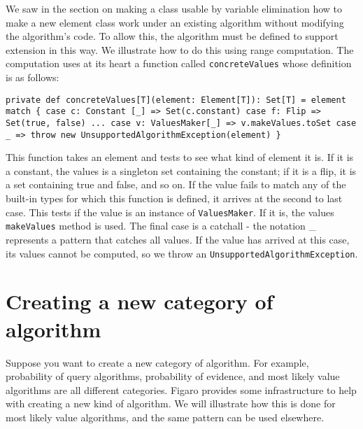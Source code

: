 We saw in the section on making a class usable by variable elimination how to make a new element class work under an existing algorithm without modifying the algorithm's code. To allow this, the algorithm must be defined to support extension in this way. We illustrate how to do this using range computation. The computation uses at its heart a function called \texttt{concreteValues} whose definition is as follows:


\begin{flushleft}
\texttt{private def concreteValues[T](element: Element[T]): Set[T] =
element match \{
\newline \tab case c: Constant [\_] => Set(c.constant)
\newline \tab case f: Flip => Set(true, false)
\newline \tab ...
\newline \tab case v: ValuesMaker[\_] => v.makeValues.toSet
\newline \tab case \_ => throw new UnsupportedAlgorithmException(element)
\newline \}
}
\end{flushleft}

This function takes an element and tests to see what kind of element it is. If it is a constant, the values is a singleton set containing the constant; if it is a flip, it is a set containing true and false, and so on. If the value fails to match any of the built-in types for which this function is defined, it arrives at the second to last case. This tests if the value is an instance of \texttt{ValuesMaker}. If it is, the values \texttt{makeValues} method is used. The final case is a catchall - the notation \_ represents a pattern that catches all values. If the value has arrived at this case, its values cannot be computed, so we throw an \texttt{UnsupportedAlgorithmException}.

\section{Creating a new category of algorithm}

Suppose you want to create a new category of algorithm. For example, probability of query algorithms, probability of evidence, and most likely value algorithms are all different categories. Figaro provides some infrastructure to help with creating a new kind of algorithm. We will illustrate how this is done for most likely value algorithms, and the same pattern can be used elsewhere.

